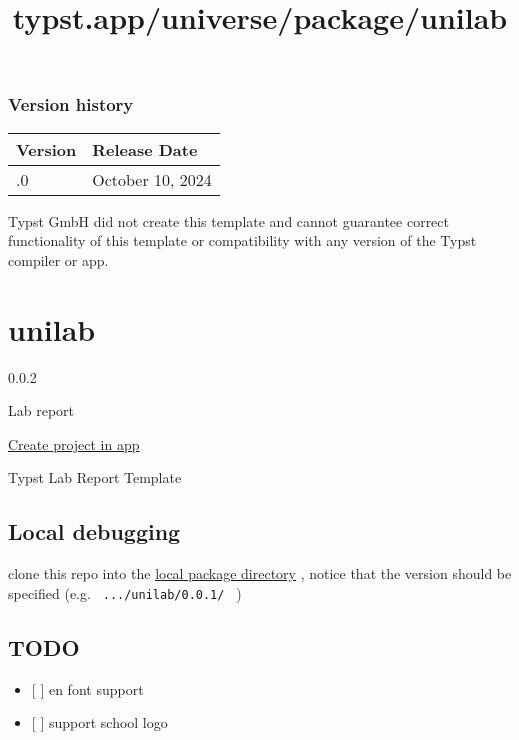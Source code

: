 \subsubsection{Version history}\label{version-history}

\begin{longtable}[]{@{}ll@{}}
\toprule\noalign{}
Version & Release Date \\
\midrule\noalign{}
\endhead
\bottomrule\noalign{}
\endlastfoot
0.1.0 & October 10, 2024 \\
\end{longtable}

Typst GmbH did not create this template and cannot guarantee correct
functionality of this template or compatibility with any version of the
Typst compiler or app.


\title{typst.app/universe/package/unilab}

\label{banner}
\label{template-thumbnail}

\section{unilab}\label{unilab}

{ 0.0.2 }

Lab report

\href{/app?template=unilab&version=0.0.2}{Create project in app}

\label{readme}
Typst Lab Report Template

\subsection{Local debugging}\label{local-debugging}

clone this repo into the
\href{https://github.com/typst/packages?tab=readme-ov-file\#local-packages}{local
package directory} , notice that the version should be specified (e.g.
\texttt{\ .../unilab/0.0.1/\ } )

\subsection{TODO}\label{todo}

\begin{itemize}
\tightlist
\item
  {[} {]} en font support
\item
  {[} {]} support school logo
\end{itemize}

